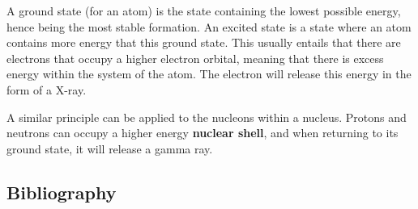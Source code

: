 \documentclass[
]{article}
\begin{document}
A ground state (for an atom) is the state containing the lowest possible
energy, hence being the most stable formation. An excited state is a
state where an atom contains more energy that this ground state. This
usually entails that there are electrons that occupy a higher electron
orbital, meaning that there is excess energy within the system of the
atom. The electron will release this energy in the form of a X-ray.

A similar principle can be applied to the nucleons within a nucleus.
Protons and neutrons can occupy a higher energy \textbf{nuclear shell},
and when returning to its ground state, it will release a gamma ray.

\hypertarget{bibliography}{%
\subsection{Bibliography}\label{bibliography}}
\end{document}
